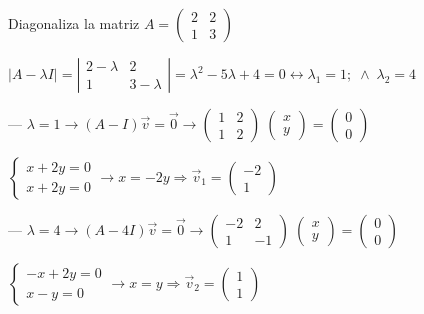 \begin{ejem}
Diagonaliza la matriz $A=\left( \begin{matrix} 2&2\\1&3 \end{matrix} \right)$

$|A-\lambda I|=\left| \begin{matrix} 2-\lambda&2\\1&3-\lambda \end{matrix}  \right|=\lambda^2-5\lambda +4=0 \leftrightarrow \lambda_1=1; \; \wedge \; \lambda_2=4	$

--- $ \lambda=1 \to (A-I)\vec v= \vec 0 \to \left( \begin{matrix} 1&2\\1&2 \end{matrix} \right)\; \left( \begin{matrix} x\\y \end{matrix} \right)=
\left( \begin{matrix} 0\\0 \end{matrix} \right)$

$\begin{cases} x+2y=0\\x+2y=0 \end{cases} \to x=-2y \Rightarrow \vec v_1=\left( \begin{matrix} -2\\1 \end{matrix} \right)$

--- $ \lambda=4 \to (A-4I)\vec v= \vec 0 \to \left( \begin{matrix} -2&2\\1&-1 \end{matrix} \right)\; \left( \begin{matrix} x\\y \end{matrix} \right)=
\left( \begin{matrix} 0\\0 \end{matrix} \right)$

$\begin{cases} -x+2y=0\\x-y=0 \end{cases} \to x=y \Rightarrow \vec v_2=\left( \begin{matrix} 1\\1 \end{matrix} \right)$


\end{ejem}
